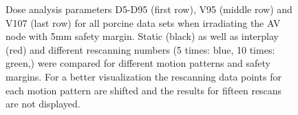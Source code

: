 \begin{figure}[H]
{}
\caption{Dose analysis parameters D5-D95 (first row), V95 (middle row) and V107 (last row) for all porcine data sets when irradiating the AV 
node with 5mm safety margin. Static (black) as well as interplay (red) and different rescanning numbers (5 times: blue, 10 times: green,) were 
compared for different motion patterns and safety margins. For a better visualization the rescanning data points for each motion pattern are 
shifted and the results for fifteen rescans are not displayed.}
\label{static_interplay_rescanning_ALLpigs}
\end{figure}

\newpage

\begin{figure}[H]
\centering
{}
\end{figure}

